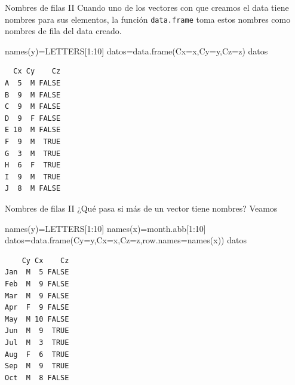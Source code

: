 \documentclass[
  ignorenonframetext,
  aspectratio=169,
  spanish,
]{beamer}
\newenvironment{Shaded}{\begin{snugshade}}{\end{snugshade}}
\newcommand{\AttributeTok}[1]{\textcolor[rgb]{0.40,0.45,0.13}{#1}}
\newcommand{\DecValTok}[1]{\textcolor[rgb]{0.68,0.00,0.00}{#1}}
\newcommand{\FunctionTok}[1]{\textcolor[rgb]{0.28,0.35,0.67}{#1}}
\newcommand{\NormalTok}[1]{\textcolor[rgb]{0.00,0.23,0.31}{#1}}
\newcommand{\OtherTok}[1]{\textcolor[rgb]{0.00,0.23,0.31}{#1}}
\newcommand{\SpecialCharTok}[1]{\textcolor[rgb]{0.37,0.37,0.37}{#1}}
\begin{document}
\begin{frame}[fragile]{Nombres de filas II}
\label{nombres-de-filas-ii}
Cuando uno de los vectores con que creamos el data tiene nombres para
sus elementos, la función \texttt{data.frame} toma estos nombres como
nombres de fila del data creado.

\begin{Shaded}
\begin{Highlighting}[]
\FunctionTok{names}\NormalTok{(y)}\OtherTok{=}\NormalTok{LETTERS[}\DecValTok{1}\SpecialCharTok{:}\DecValTok{10}\NormalTok{] }
\NormalTok{datos}\OtherTok{=}\FunctionTok{data.frame}\NormalTok{(}\AttributeTok{Cx=}\NormalTok{x,}\AttributeTok{Cy=}\NormalTok{y,}\AttributeTok{Cz=}\NormalTok{z) }
\NormalTok{datos}
\end{Highlighting}
\end{Shaded}

\begin{verbatim}
  Cx Cy    Cz
A  5  M FALSE
B  9  M FALSE
C  9  M FALSE
D  9  F FALSE
E 10  M FALSE
F  9  M  TRUE
G  3  M  TRUE
H  6  F  TRUE
I  9  M  TRUE
J  8  M FALSE
\end{verbatim}
\end{frame}

\begin{frame}[fragile]{Nombres de filas II}
\label{nombres-de-filas-ii-1}
¿Qué pasa si más de un vector tiene nombres? Veamos

\begin{Shaded}
\begin{Highlighting}[]
\FunctionTok{names}\NormalTok{(y)}\OtherTok{=}\NormalTok{LETTERS[}\DecValTok{1}\SpecialCharTok{:}\DecValTok{10}\NormalTok{] }
\FunctionTok{names}\NormalTok{(x)}\OtherTok{=}\NormalTok{month.abb[}\DecValTok{1}\SpecialCharTok{:}\DecValTok{10}\NormalTok{]}
\NormalTok{datos}\OtherTok{=}\FunctionTok{data.frame}\NormalTok{(}\AttributeTok{Cy=}\NormalTok{y,}\AttributeTok{Cx=}\NormalTok{x,}\AttributeTok{Cz=}\NormalTok{z,}\AttributeTok{row.names=}\FunctionTok{names}\NormalTok{(x)) }
\NormalTok{datos}
\end{Highlighting}
\end{Shaded}

\begin{verbatim}
    Cy Cx    Cz
Jan  M  5 FALSE
Feb  M  9 FALSE
Mar  M  9 FALSE
Apr  F  9 FALSE
May  M 10 FALSE
Jun  M  9  TRUE
Jul  M  3  TRUE
Aug  F  6  TRUE
Sep  M  9  TRUE
Oct  M  8 FALSE
\end{verbatim}
\end{frame}
\end{document}
